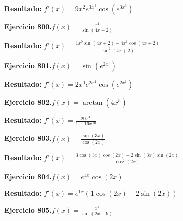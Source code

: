 \documentclass[10pt,a4paper]{article}
\begin{document}
\begin{solbox}
\textbf{Resultado:} \(\displaystyle f'(x) = 9x^{2}e^{3x^{3}}\cos(e^{3x^{3}})\)
\end{solbox}

\begin{ejbox}
\textbf{Ejercicio 800.}\quad $f(x) = \frac{x^{1}}{\sin(4x +2)}$
\end{ejbox}

\begin{solbox}
\textbf{Resultado:} \(\displaystyle f'(x) = \frac{1x^{0}\sin(4x +2) - 4x^{1}\cos(4x +2)}{\sin^2(4x +2)}\)
\end{solbox}

\begin{ejbox}
\textbf{Ejercicio 801.}\quad $f(x) = \sin(e^{2x^{1}})$
\end{ejbox}

\begin{solbox}
\textbf{Resultado:} \(\displaystyle f'(x) = 2x^{0}e^{2x^{1}}\cos(e^{2x^{1}})\)
\end{solbox}

\newpage
\begin{ejbox}
\textbf{Ejercicio 802.}\quad $f(x) = \arctan(4x^{5})$
\end{ejbox}

\begin{solbox}
\textbf{Resultado:} \(\displaystyle f'(x) = \frac{20x^{4}}{1+16x^{10}}\)
\end{solbox}

\begin{ejbox}
\textbf{Ejercicio 803.}\quad $f(x) = \frac{\sin(3x)}{\cos(2x)}$
\end{ejbox}

\begin{solbox}
\textbf{Resultado:} \(\displaystyle f'(x) = \frac{3\cos(3x)\cos(2x) + 2\sin(3x)\sin(2x)}{\cos^2(2x)}\)
\end{solbox}

\begin{ejbox}
\textbf{Ejercicio 804.}\quad $f(x) = e^{1x} \cos(2x)$
\end{ejbox}

\begin{solbox}
\textbf{Resultado:} \(\displaystyle f'(x) = e^{1x}(1\cos(2x) - 2\sin(2x))\)
\end{solbox}

\newpage
\begin{ejbox}
\textbf{Ejercicio 805.}\quad $f(x) = \frac{x^{4}}{\sin(2x +9)}$
\end{ejbox}
\end{document}
